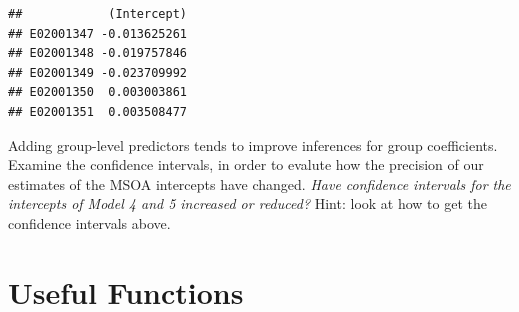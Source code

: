 \documentclass[
]{book}
\newenvironment{Shaded}{\begin{snugshade}}{\end{snugshade}}
\newcommand{\CommentTok}[1]{\textcolor[rgb]{0.56,0.35,0.01}{\textit{#1}}}
\newcommand{\DecValTok}[1]{\textcolor[rgb]{0.00,0.00,0.81}{#1}}
\newcommand{\KeywordTok}[1]{\textcolor[rgb]{0.13,0.29,0.53}{\textbf{#1}}}
\newcommand{\NormalTok}[1]{#1}
\newcommand{\OperatorTok}[1]{\textcolor[rgb]{0.81,0.36,0.00}{\textbf{#1}}}
\newcommand{\StringTok}[1]{\textcolor[rgb]{0.31,0.60,0.02}{#1}}
\begin{document}
\begin{Shaded}
\end{Shaded}

\begin{verbatim}
##            (Intercept)
## E02001347 -0.013625261
## E02001348 -0.019757846
## E02001349 -0.023709992
## E02001350  0.003003861
## E02001351  0.003508477
\end{verbatim}

Adding group-level predictors tends to improve inferences for group coefficients. Examine the confidence intervals, in order to evalute how the precision of our estimates of the MSOA intercepts have changed. \emph{Have confidence intervals for the intercepts of Model 4 and 5 increased or reduced?} Hint: look at how to get the confidence intervals above.

\hypertarget{useful-functions-1}{%
\section{Useful Functions}\label{useful-functions-1}}
\end{document}
